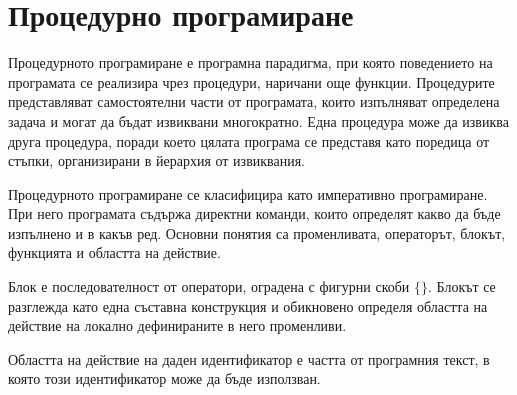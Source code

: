 \begin{konspekt}
\end{konspekt}

\section{Процедурно програмиране}\label{s:14.1}

\begin{defn}
Процедурното програмиране е програмна парадигма, при която поведението на програмата се реализира чрез процедури, наричани още функции. Процедурите представляват самостоятелни части от програмата, които изпълняват определена задача и могат да бъдат извиквани многократно. Една процедура може да извиква друга процедура, поради което цялата програма се представя като поредица от стъпки, организирани в йерархия от извиквания.
\end{defn}

Процедурното програмиране се класифицира като императивно програмиране. При него програмата съдържа директни команди, които определят какво да бъде изпълнено и в какъв ред. Основни понятия са променливата, операторът, блокът, функцията и областта на действие.

\begin{defn}[Блок]
Блок е последователност от оператори, оградена с фигурни скоби $\{\}$.
Блокът се разглежда като една съставна конструкция и обикновено определя областта на действие на локално дефинираните в него променливи.
\end{defn}

\begin{defn}
Областта на действие на даден идентификатор е частта от програмния текст, в която този идентификатор може да бъде използван.
\end{defn}


